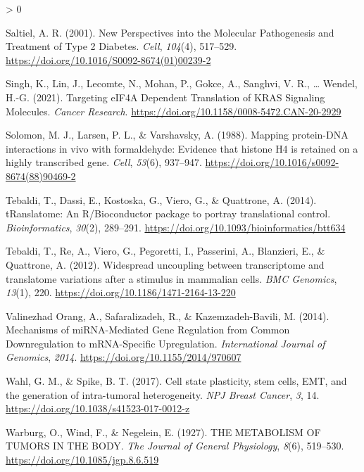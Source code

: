 \documentclass[
  12pt,
  openany]{book}
\newlength{\cslhangindent}
\newenvironment{CSLReferences}[2] %
 {%
  \setlength{\parindent}{0pt}
  \ifodd #1 \everypar{\setlength{\hangindent}{\cslhangindent}}\ignorespaces\fi
  \ifnum #2 > 0
  \setlength{\parskip}{#2\baselineskip}
  \fi
 }%
 {}
\begin{document}
\begin{CSLReferences}{1}{0}
\leavevmode\hypertarget{ref-Saltiel2001}{}%
Saltiel, A. R. (2001). New {Perspectives} into the {Molecular Pathogenesis} and {Treatment} of {Type} 2 {Diabetes}. \emph{Cell}, \emph{104}(4), 517--529. \url{https://doi.org/10.1016/S0092-8674(01)00239-2}

\leavevmode\hypertarget{ref-Singh2021}{}%
Singh, K., Lin, J., Lecomte, N., Mohan, P., Gokce, A., Sanghvi, V. R., \ldots{} Wendel, H.-G. (2021). Targeting {eIF4A Dependent Translation} of {KRAS Signaling Molecules}. \emph{Cancer Research}. \url{https://doi.org/10.1158/0008-5472.CAN-20-2929}

\leavevmode\hypertarget{ref-Solomon1988}{}%
Solomon, M. J., Larsen, P. L., \& Varshavsky, A. (1988). Mapping protein-{DNA} interactions in vivo with formaldehyde: Evidence that histone {H4} is retained on a highly transcribed gene. \emph{Cell}, \emph{53}(6), 937--947. \url{https://doi.org/10.1016/s0092-8674(88)90469-2}

\leavevmode\hypertarget{ref-Tebaldi2014}{}%
Tebaldi, T., Dassi, E., Kostoska, G., Viero, G., \& Quattrone, A. (2014). {tRanslatome}: An {R}/{Bioconductor} package to portray translational control. \emph{Bioinformatics}, \emph{30}(2), 289--291. \url{https://doi.org/10.1093/bioinformatics/btt634}

\leavevmode\hypertarget{ref-Tebaldi2012}{}%
Tebaldi, T., Re, A., Viero, G., Pegoretti, I., Passerini, A., Blanzieri, E., \& Quattrone, A. (2012). Widespread uncoupling between transcriptome and translatome variations after a stimulus in mammalian cells. \emph{BMC Genomics}, \emph{13}(1), 220. \url{https://doi.org/10.1186/1471-2164-13-220}

\leavevmode\hypertarget{ref-ValinezhadOrang2014}{}%
Valinezhad Orang, A., Safaralizadeh, R., \& Kazemzadeh-Bavili, M. (2014). Mechanisms of {miRNA}-{Mediated Gene Regulation} from {Common Downregulation} to {mRNA}-{Specific Upregulation}. \emph{International Journal of Genomics}, \emph{2014}. \url{https://doi.org/10.1155/2014/970607}

\leavevmode\hypertarget{ref-Wahl2017}{}%
Wahl, G. M., \& Spike, B. T. (2017). Cell state plasticity, stem cells, {EMT}, and the generation of intra-tumoral heterogeneity. \emph{NPJ Breast Cancer}, \emph{3}, 14. \url{https://doi.org/10.1038/s41523-017-0012-z}

\leavevmode\hypertarget{ref-Warburg1927}{}%
Warburg, O., Wind, F., \& Negelein, E. (1927). {THE METABOLISM OF TUMORS IN THE BODY}. \emph{The Journal of General Physiology}, \emph{8}(6), 519--530. \url{https://doi.org/10.1085/jgp.8.6.519}


\end{CSLReferences}
\end{document}
